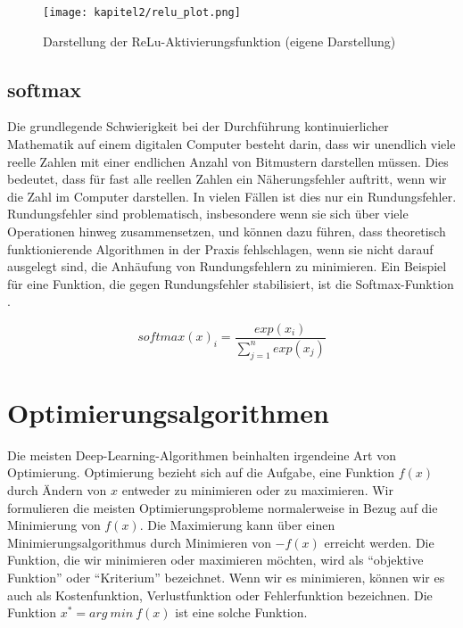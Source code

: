 \begin{figure}[H]
  \centering
  \texttt{[image: kapitel2/relu\_plot.png]}
  \caption[Darstellung der ReLu-Aktivierungsfunktion]{Darstellung der ReLu-Aktivierungsfunktion (eigene Darstellung)}
  \label{Kap2:ReLu_plot}
\end{figure}

\subsection{softmax}
Die grundlegende Schwierigkeit bei der Durchführung kontinuierlicher Mathematik auf einem digitalen Computer besteht darin, dass wir unendlich viele reelle Zahlen mit einer endlichen Anzahl von Bitmustern darstellen müssen. Dies bedeutet, dass für fast alle reellen Zahlen ein Näherungsfehler auftritt, wenn wir die Zahl im Computer darstellen. In vielen Fällen ist dies nur ein Rundungsfehler. Rundungsfehler sind problematisch, insbesondere wenn sie sich über viele Operationen hinweg zusammensetzen, und können dazu führen, dass theoretisch funktionierende Algorithmen in der Praxis fehlschlagen, wenn sie nicht darauf ausgelegt sind, die Anhäufung von Rundungsfehlern zu minimieren. Ein Beispiel für eine Funktion, die gegen Rundungsfehler stabilisiert, ist die Softmax-Funktion \cite*[80-81]{IanGoodfellowYoshuaBengio2016}.

\begin{equation} \label{FormelSoft}
  softmax( x)_{i} =\frac{exp( x_{i})}{\sum ^{n}_{j=1} exp( x_{j})}
\end{equation}

\section{Optimierungsalgorithmen}
Die meisten Deep-Learning-Algorithmen beinhalten irgendeine Art von Optimierung. Optimierung bezieht sich auf die Aufgabe, eine Funktion $f(x)$ durch Ändern von $x$ entweder zu minimieren oder zu maximieren. Wir formulieren die meisten Optimierungsprobleme normalerweise in Bezug auf die Minimierung von $f(x)$. Die Maximierung kann über einen Minimierungsalgorithmus durch Minimieren von $-$$f(x)$ erreicht werden. Die Funktion, die wir minimieren oder maximieren möchten, wird als \enquote{objektive Funktion} oder \enquote{Kriterium} bezeichnet. Wenn wir es minimieren, können wir es auch als Kostenfunktion, Verlustfunktion oder Fehlerfunktion bezeichnen. Die Funktion $x^{*} = arg\ min\ f( x)$ ist eine solche Funktion.

